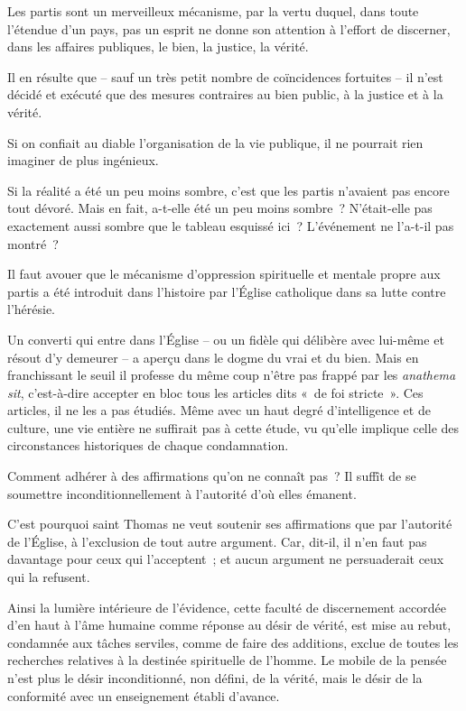 \documentclass[french,twoside]{book} %
\begin{document}
Les partis sont un merveilleux mécanisme, par la vertu duquel, dans toute l’étendue d’un pays, pas un esprit ne donne son attention à l’effort de discerner, dans les affaires publiques, le bien, la justice, la vérité.\par
Il en résulte que – sauf un très petit nombre de coïncidences fortuites – il n’est décidé et exécuté que des mesures contraires au bien public, à la justice et à la vérité.\par
Si on confiait au diable l’organisation de la vie publique, il ne pourrait rien imaginer de plus ingénieux.\par
Si la réalité a été un peu moins sombre, c’est que les partis n’avaient pas encore tout dévoré. Mais en fait, a-t-elle été un peu moins sombre ? N’était-elle pas exactement aussi sombre que le tableau esquissé ici ? L’événement ne l’a-t-il pas montré ?\par
Il faut avouer que le mécanisme d’oppression spirituelle et mentale propre aux partis a été introduit dans l’histoire par l’Église catholique dans sa lutte contre l’hérésie.\par
Un converti qui entre dans l’Église – ou un fidèle qui délibère avec lui-même et résout d’y demeurer – a aperçu dans le dogme du vrai et du bien. Mais en franchissant le seuil il professe du même coup n’être pas frappé par les \emph{anathema sit}, c’est-à-dire accepter en bloc tous les articles dits « de foi stricte ». Ces articles, il ne les a pas étudiés. Même avec un haut degré d’intelligence et de culture, une vie entière ne suffirait pas à cette étude, vu qu’elle implique celle des circonstances historiques de chaque condamnation.\par
Comment adhérer à des affirmations qu’on ne connaît pas ? Il suffît de se soumettre inconditionnellement à l’autorité d’où elles émanent.\par
C’est pourquoi saint Thomas ne veut soutenir ses affirmations que par l’autorité de l’Église, à l’exclusion de tout autre argument. Car, dit-il, il n’en faut pas davantage pour ceux qui l’acceptent ; et aucun argument ne persuaderait ceux qui la refusent.\par
Ainsi la lumière intérieure de l’évidence, cette faculté de discernement accordée d’en haut à l’âme humaine comme réponse au désir de vérité, est mise au rebut, condamnée aux tâches serviles, comme de faire des additions, exclue de toutes les recherches relatives à la destinée spirituelle de l’homme. Le mobile de la pensée n’est plus le désir inconditionné, non défini, de la vérité, mais le désir de la conformité avec un enseignement établi d’avance.\par
\end{document}

